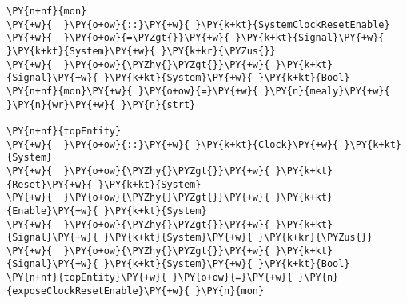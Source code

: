 {\begin{Verbatim}[commandchars=\\\{\}]
\PY{n+nf}{mon}
\PY{+w}{  }\PY{o+ow}{::}\PY{+w}{ }\PY{k+kt}{SystemClockResetEnable}
\PY{+w}{  }\PY{o+ow}{=\PYZgt{}}\PY{+w}{ }\PY{k+kt}{Signal}\PY{+w}{ }\PY{k+kt}{System}\PY{+w}{ }\PY{k+kr}{\PYZus{}}
\PY{+w}{  }\PY{o+ow}{\PYZhy{}\PYZgt{}}\PY{+w}{ }\PY{k+kt}{Signal}\PY{+w}{ }\PY{k+kt}{System}\PY{+w}{ }\PY{k+kt}{Bool}
\PY{n+nf}{mon}\PY{+w}{ }\PY{o+ow}{=}\PY{+w}{ }\PY{n}{mealy}\PY{+w}{ }\PY{n}{wr}\PY{+w}{ }\PY{n}{strt}

\PY{n+nf}{topEntity}
\PY{+w}{  }\PY{o+ow}{::}\PY{+w}{ }\PY{k+kt}{Clock}\PY{+w}{ }\PY{k+kt}{System}
\PY{+w}{  }\PY{o+ow}{\PYZhy{}\PYZgt{}}\PY{+w}{ }\PY{k+kt}{Reset}\PY{+w}{ }\PY{k+kt}{System}
\PY{+w}{  }\PY{o+ow}{\PYZhy{}\PYZgt{}}\PY{+w}{ }\PY{k+kt}{Enable}\PY{+w}{ }\PY{k+kt}{System}
\PY{+w}{  }\PY{o+ow}{\PYZhy{}\PYZgt{}}\PY{+w}{ }\PY{k+kt}{Signal}\PY{+w}{ }\PY{k+kt}{System}\PY{+w}{ }\PY{k+kr}{\PYZus{}}
\PY{+w}{  }\PY{o+ow}{\PYZhy{}\PYZgt{}}\PY{+w}{ }\PY{k+kt}{Signal}\PY{+w}{ }\PY{k+kt}{System}\PY{+w}{ }\PY{k+kt}{Bool}
\PY{n+nf}{topEntity}\PY{+w}{ }\PY{o+ow}{=}\PY{+w}{ }\PY{n}{exposeClockResetEnable}\PY{+w}{ }\PY{n}{mon}
\end{Verbatim}
}